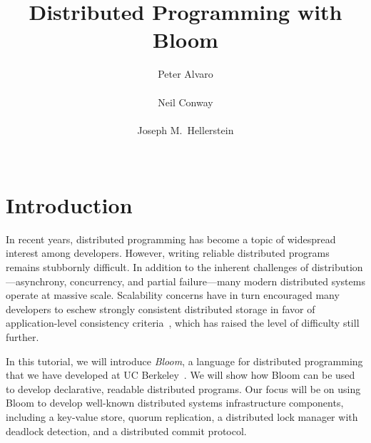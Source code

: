 \documentclass{sig-alternate}
\begin{document}
\title{Distributed Programming with Bloom}

\author{
\alignauthor
Peter Alvaro\\
        \\
\alignauthor
Neil Conway\\
        \\
\alignauthor
Joseph M.\ Hellerstein\\
        \\
}

\maketitle

\section{Introduction}

In recent years, distributed programming has become a topic of widespread
interest among developers. However, writing reliable distributed programs
remains stubbornly difficult. In addition to the inherent challenges of
distribution---asynchrony, concurrency, and partial failure---many modern
distributed systems operate at massive scale. Scalability concerns have in turn
encouraged many developers to eschew strongly consistent distributed storage in
favor of application-level consistency criteria~\cite{Birman2009,Helland2009},
which has raised the level of difficulty still further.

In this tutorial, we will introduce \emph{Bloom}, a language for distributed
programming that we have developed at UC Berkeley~\cite{bloom-website}. We will
show how Bloom can be used to develop declarative, readable distributed
programs. Our focus will be on using Bloom to develop well-known distributed
systems infrastructure components, including a key-value store, quorum
replication, a distributed lock manager with deadlock detection, and a
distributed commit protocol.
\end{document}
